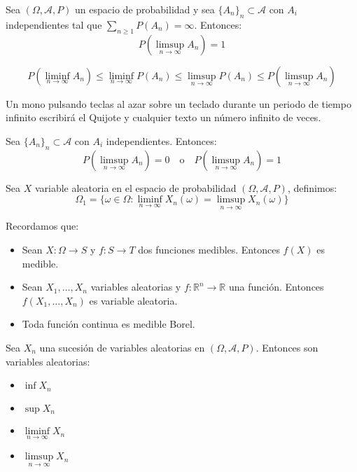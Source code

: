 \begin{theorem}
    Sea $(\Omega, \mathcal{A}, P)$ un espacio de probabilidad y sea $\{A_n\}_n \subset \mathcal{A}$ con $A_i$ independientes tal que $\sum_{n \geq 1} P(A_n) = \infty$.
    Entonces:
    $$P(\limsup\limits_{n \to \infty} A_n) = 1$$
\end{theorem}

\begin{remark}
    $$P(\liminf\limits_{n \to \infty} A_n) \leq \liminf\limits_{n \to \infty} P(A_n) \leq \limsup\limits_{n \to \infty} P(A_n) \leq P(\limsup\limits_{n \to \infty} A_n)$$
\end{remark}

\begin{example}
    Un mono pulsando teclas al azar sobre un teclado durante un periodo de tiempo infinito escribirá el Quijote y cualquier texto un número infinito de veces.
\end{example}

\begin{corollary}
    Sea $\{A_n\}_n \subset \mathcal{A}$ con $A_i$ independientes.
    Entonces:
    $$P(\limsup\limits_{n \to \infty} A_n) = 0 \quad \text{o} \quad P(\limsup\limits_{n \to \infty} A_n) = 1$$
\end{corollary}

Sea $X$ variable aleatoria en el espacio de probabilidad $(\Omega, \mathcal{A}, P)$, definimos:
$$\Omega_1 = \{ \omega \in \Omega : \liminf\limits_{n \to \infty} X_n(\omega) = \limsup\limits_{n \to \infty} X_n(\omega) \}$$

Recordamos que:
\begin{itemize}
    \item Sean $X: \Omega \to S$ y $f: S \to T$ dos funciones medibles.
          Entonces $f(X)$ es medible.
    \item Sean $X_1, \dots, X_n$ variables aleatorias y $f: \mathbb{R}^n \to \mathbb{R}$ una función.
          Entonces $f(X_1, \dots, X_n)$ es variable aleatoria.
    \item Toda función continua es medible Borel.
\end{itemize}

\begin{theorem}
    Sea ${X_n}$ una sucesión de variables aleatorias en $(\Omega, \mathcal{A}, P)$.
    Entonces son variables aleatorias:
    \begin{itemize}
        \item $\inf X_n$
        \item $\sup X_n$
        \item $\liminf\limits_{n \to \infty} X_n$
        \item $\limsup\limits_{n \to \infty} X_n$
    \end{itemize}
\end{theorem}

